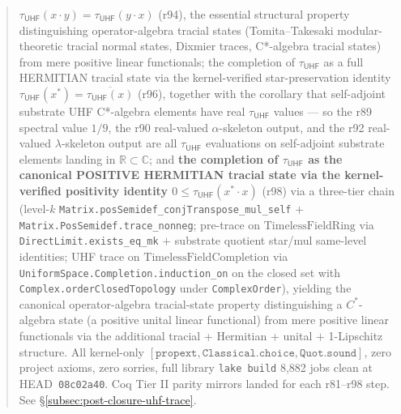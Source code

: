 \documentclass[11pt,a4paper]{amsart}
\theoremstyle{plain}
\theoremstyle{definition}
\begin{document}
\begin{abstract}
$\tau_{\textsf{UHF}}(x \cdot y) = \tau_{\textsf{UHF}}(y \cdot x)$ (r94), the essential structural property distinguishing operator-algebra tracial states (Tomita--Takesaki modular-theoretic tracial normal states, Dixmier traces, C*-algebra tracial states) from mere positive linear functionals; the completion of $\tau_{\textsf{UHF}}$ as a full HERMITIAN tracial state via the kernel-verified star-preservation identity $\tau_{\textsf{UHF}}(x^*) = \overline{\tau_{\textsf{UHF}}(x)}$ (r96), together with the corollary that self-adjoint substrate UHF C*-algebra elements have real $\tau_{\textsf{UHF}}$ values --- so the r89 spectral value $1/9$, the r90 real-valued $\alpha$-skeleton output, and the r92 real-valued $\lambda$-skeleton output are all $\tau_{\textsf{UHF}}$ evaluations on self-adjoint substrate elements landing in $\mathbb{R} \subset \mathbb{C}$; and \textbf{the completion of $\tau_{\textsf{UHF}}$ as the canonical POSITIVE HERMITIAN tracial state via the kernel-verified positivity identity $0 \le \tau_{\textsf{UHF}}(x^* \cdot x)$} (r98) via a three-tier chain (level-$k$ \texttt{Matrix.posSemidef\_conjTranspose\_mul\_self} $+$ \texttt{Matrix.PosSemidef.trace\_nonneg}; pre-trace on $\mathrm{TimelessFieldRing}$ via \texttt{DirectLimit.exists\_eq\_mk} $+$ substrate quotient star/mul same-level identities; UHF trace on $\mathrm{TimelessFieldCompletion}$ via \texttt{UniformSpace.Completion.induction\_on} on the closed set with \texttt{Complex.orderClosedTopology} under \texttt{ComplexOrder}), yielding the canonical operator-algebra tracial-state property distinguishing a $C^*$-algebra state (a positive unital linear functional) from mere positive linear functionals via the additional tracial + Hermitian + unital $+$ 1-Lipschitz structure. All kernel-only $[\texttt{propext}, \texttt{Classical.choice}, \texttt{Quot.sound}]$, zero project axioms, zero sorries, full library \texttt{lake build} 8{,}882 jobs clean at HEAD~\texttt{08c02a40}. Coq Tier II parity mirrors landed for each r81--r98 step. See \S\ref{subsec:post-closure-uhf-trace}.


\end{abstract}
\end{document}
